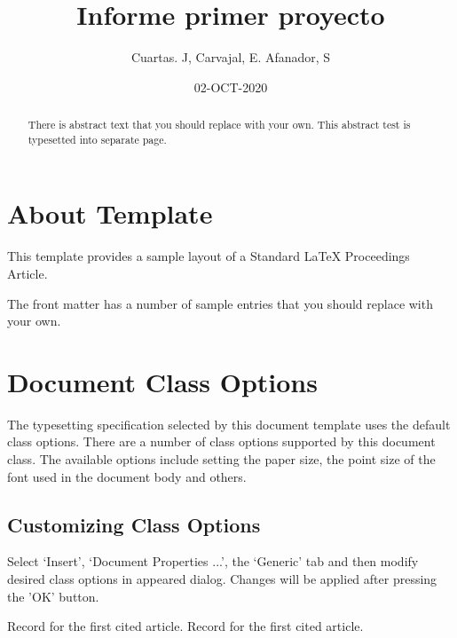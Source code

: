 \documentclass[draft,openbib]{proc}
\begin{document}
\begin{abstract}
    There is abstract text that you should replace with your own. 
     This abstract test is typesetted into separate page.
\end{abstract}

\title{Informe primer proyecto }
\author{Cuartas. J, Carvajal, E. Afanador, S}
\date{02-OCT-2020}
\maketitle

\tableofcontents

\section{About Template}
This template provides a sample layout of a Standard \LaTeX{} Proceedings Article.

The front matter has a number of sample entries that you should replace
with your own. 

\section{Document Class Options}
The typesetting specification selected by this document template
uses the default class options. There are a number of class options 
supported by this document class. The available options include 
setting the paper size, the point size of the font used in the 
document body and others.

\subsection{Customizing Class Options}
Select `Insert', `Document Properties ...', the `Generic' tab
and then modify desired class options in appeared dialog.
Changes will be applied after pressing the 'OK' button.

\begin{thebibliography}{99}
 Record for the first cited article.
 Record for the first cited article.
\end{thebibliography}
\end{document}
